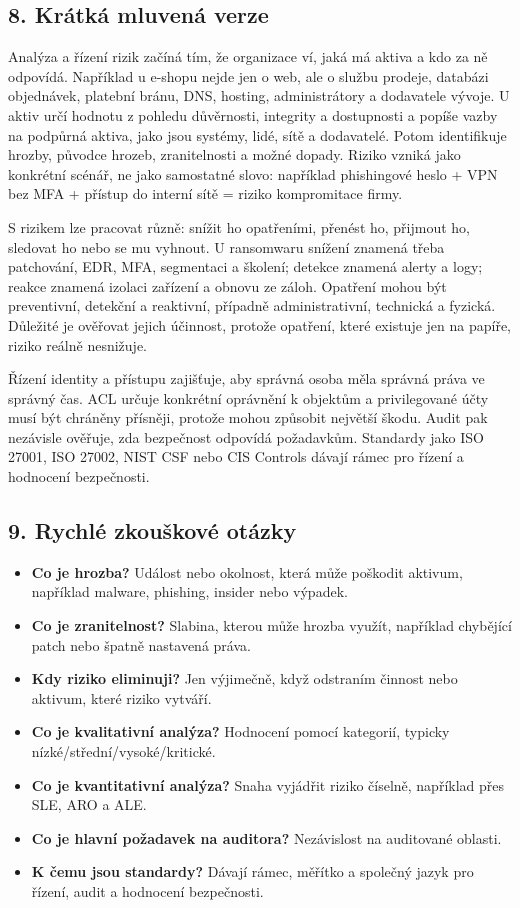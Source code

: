 \documentclass[11pt,a4paper]{article}
\begin{document}
\subsection*{8. Krátká mluvená verze}

Analýza a řízení rizik začíná tím, že organizace ví, jaká má aktiva a kdo za ně odpovídá. Například u e-shopu nejde jen o web, ale o službu prodeje, databázi objednávek, platební bránu, DNS, hosting, administrátory a dodavatele vývoje. U aktiv určí hodnotu z pohledu důvěrnosti, integrity a dostupnosti a popíše vazby na podpůrná aktiva, jako jsou systémy, lidé, sítě a dodavatelé. Potom identifikuje hrozby, původce hrozeb, zranitelnosti a možné dopady. Riziko vzniká jako konkrétní scénář, ne jako samostatné slovo: například phishingové heslo + VPN bez MFA + přístup do interní sítě = riziko kompromitace firmy.

S rizikem lze pracovat různě: snížit ho opatřeními, přenést ho, přijmout ho, sledovat ho nebo se mu vyhnout. U ransomwaru snížení znamená třeba patchování, EDR, MFA, segmentaci a školení; detekce znamená alerty a logy; reakce znamená izolaci zařízení a obnovu ze záloh. Opatření mohou být preventivní, detekční a reaktivní, případně administrativní, technická a fyzická. Důležité je ověřovat jejich účinnost, protože opatření, které existuje jen na papíře, riziko reálně nesnižuje.

Řízení identity a přístupu zajišťuje, aby správná osoba měla správná práva ve správný čas. ACL určuje konkrétní oprávnění k objektům a privilegované účty musí být chráněny přísněji, protože mohou způsobit největší škodu. Audit pak nezávisle ověřuje, zda bezpečnost odpovídá požadavkům. Standardy jako ISO 27001, ISO 27002, NIST CSF nebo CIS Controls dávají rámec pro řízení a hodnocení bezpečnosti.

\subsection*{9. Rychlé zkouškové otázky}

\begin{itemize}
    \item \textbf{Co je hrozba?} Událost nebo okolnost, která může poškodit aktivum, například malware, phishing, insider nebo výpadek.
    \item \textbf{Co je zranitelnost?} Slabina, kterou může hrozba využít, například chybějící patch nebo špatně nastavená práva.
    \item \textbf{Kdy riziko eliminuji?} Jen výjimečně, když odstraním činnost nebo aktivum, které riziko vytváří.
    \item \textbf{Co je kvalitativní analýza?} Hodnocení pomocí kategorií, typicky nízké/střední/vysoké/kritické.
    \item \textbf{Co je kvantitativní analýza?} Snaha vyjádřit riziko číselně, například přes SLE, ARO a ALE.
    \item \textbf{Co je hlavní požadavek na auditora?} Nezávislost na auditované oblasti.
    \item \textbf{K čemu jsou standardy?} Dávají rámec, měřítko a společný jazyk pro řízení, audit a hodnocení bezpečnosti.
\end{itemize}
\end{document}
